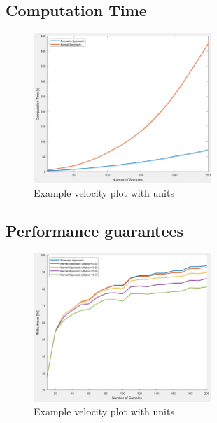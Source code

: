 \begin{figure}[htb]
\centering
{}
\quad %
\end{figure}

\subsection{Computation Time} \label{computation time}

\begin{figure}[htb]
\centering
\includegraphics[width=0.6\textwidth]{pics/computationtime_plot.png}
\caption{Example velocity plot with units}
\label{fig:vel_plot}
\end{figure}

\subsection{Performance guarantees} \label{performance guarantees}

\begin{figure}[htb]
\centering
\includegraphics[width=0.6\textwidth]{pics/robustness_plot.png}
\caption{Example velocity plot with units}
\label{fig:vel_plot}
\end{figure}
 


